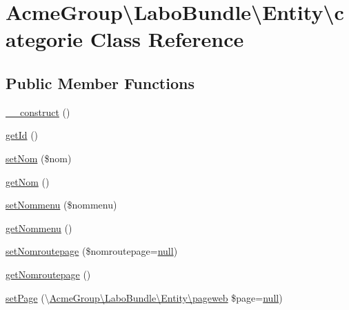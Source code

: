 \hypertarget{class_acme_group_1_1_labo_bundle_1_1_entity_1_1categorie}{\section{Acme\+Group\textbackslash{}Labo\+Bundle\textbackslash{}Entity\textbackslash{}categorie Class Reference}
\label{class_acme_group_1_1_labo_bundle_1_1_entity_1_1categorie}
}
\subsection*{Public Member Functions}
\begin{DoxyCompactItemize}
\item 
\hyperlink{class_acme_group_1_1_labo_bundle_1_1_entity_1_1categorie_a6e7548fec969c8c85b619dfaceb2e07f}{\+\_\+\+\_\+construct} ()
\item 
\hyperlink{class_acme_group_1_1_labo_bundle_1_1_entity_1_1categorie_a718cffff0de9e18f97457e60746011c8}{get\+Id} ()
\item 
\hyperlink{class_acme_group_1_1_labo_bundle_1_1_entity_1_1categorie_a4b7ea64c1241b14f3da769f986952e3c}{set\+Nom} (\$nom)
\item 
\hyperlink{class_acme_group_1_1_labo_bundle_1_1_entity_1_1categorie_ac2242eccfcfb82d2c8754be4fa97c3a8}{get\+Nom} ()
\item 
\hyperlink{class_acme_group_1_1_labo_bundle_1_1_entity_1_1categorie_a87250cfda76bd5b66f0b92debff3f96d}{set\+Nommenu} (\$nommenu)
\item 
\hyperlink{class_acme_group_1_1_labo_bundle_1_1_entity_1_1categorie_a320cc35bce0927c7b3f071d78a6e9a9c}{get\+Nommenu} ()
\item 
\hyperlink{class_acme_group_1_1_labo_bundle_1_1_entity_1_1categorie_a5d14fe93712d727f799ea1559f5142c1}{set\+Nomroutepage} (\$nomroutepage=\hyperlink{validate_8js_afb8e110345c45e74478894341ab6b28e}{null})
\item 
\hyperlink{class_acme_group_1_1_labo_bundle_1_1_entity_1_1categorie_ac131e341af2d2a840f53881846043762}{get\+Nomroutepage} ()
\item 
\hyperlink{class_acme_group_1_1_labo_bundle_1_1_entity_1_1categorie_aa23a5d8b89d334b4b169e4a32eae3038}{set\+Page} (\textbackslash{}\hyperlink{class_acme_group_1_1_labo_bundle_1_1_entity_1_1pageweb}{Acme\+Group\textbackslash{}\+Labo\+Bundle\textbackslash{}\+Entity\textbackslash{}pageweb} \$page=\hyperlink{validate_8js_afb8e110345c45e74478894341ab6b28e}{null})

\end{DoxyCompactItemize}
